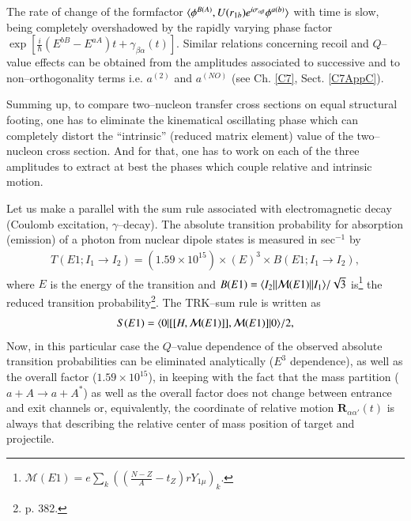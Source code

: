 \begin{subappendices}
 
 The rate of change of the formfactor $\langle {\phi^{B(A)},U(r_{1b})e^{i\sigma_{\alpha\beta}}\phi^{a(b)}} \rangle$ with time is slow, being completely overshadowed by the rapidly varying phase factor\\ $\exp\left[\frac{i}{\hbar}(E^{bB}-E^{aA})t+\gamma_{\beta\alpha}(t)\right]$. Similar relations concerning recoil and $Q$--value effects can be obtained from the amplitudes associated to successive and to non--orthogonality terms i.e. $a^{(2)}$ and $a^{(NO)}$ (see Ch. \ref{C7}, Sect. \ref{C7AppC}).
 
 
 Summing up, to compare two--nucleon transfer cross sections on equal structural footing, one has to eliminate the kinematical oscillating phase which can completely distort the ``intrinsic'' (reduced matrix element) value of the two--nucleon cross section. And for that, one has to work on each of the three amplitudes to extract at best the phases which couple relative and intrinsic motion.
 
 
 
 Let us make a parallel with the sum rule associated with electromagnetic decay (Coulomb excitation, $\gamma$--decay). The absolute transition probability for absorption (emission) of a photon from nuclear dipole states is measured in sec$^{-1}$ by
 \begin{align}
 T(E1;I_1\to I_2)=\left(1.59\times 10^{15}\right)\times (E)^3\times B(E1;I_1\to I_2),
 \end{align}
 where $E$ is the energy of the transition and $B(E1)=\langle {I_2||\mathcal M(E1)||I_1} \rangle/\sqrt{3}$ is\footnote{$\mathcal M(E1)=e\sum_k\left(\left(\frac{N-Z}{A}-t_Z\right)rY_{1\mu}\right)_k$.} the reduced transition probability\footnote{\cite{Bohr:69} p. 382.}. The TRK--sum rule is written as
 \begin{align}
 S(E1)=\langle {0}|[[H,\mathcal M(E1)]],\mathcal M(E1)]|{0} \rangle/2,
 \end{align}
 Now, in this particular case the $Q$--value dependence of the observed absolute transition probabilities can be eliminated analytically ($E^3$ dependence), as well as the overall factor  ($1.59\times 10^{15}$), in keeping with the fact that the mass partition ($a+A\rightarrow a+A^*$) as well as the overall factor does not change between entrance and exit channels or, equivalently, the coordinate of relative motion $\mathbf R_{\alpha\alpha'}(t)$ is always that describing the relative center of mass position of target and projectile. 
 

\end{subappendices}
